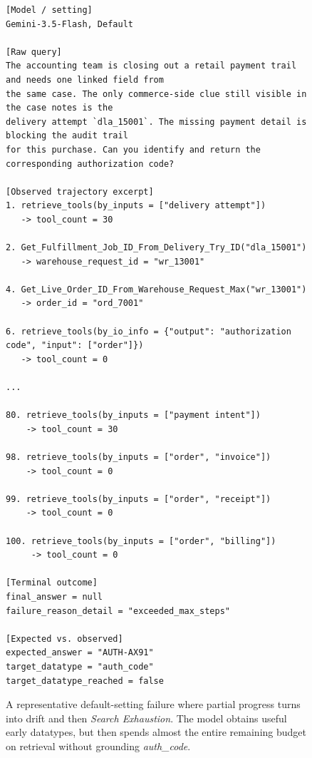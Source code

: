 \begin{figure}[htbp]
\begin{tcolorbox}[
    colback=black!5!white,
    colframe=black,
    title=Error Case: Irrecoverable Drift with Search Exhaustion,
    fonttitle=\bfseries,
    colbacktitle=black!20!white,
    coltitle=black,
    boxrule=1.5pt,
    arc=5pt,
    boxsep=5pt,
    left=12pt,
    right=12pt,
    top=12pt,
    bottom=12pt
]
\begin{lstlisting}[basicstyle=\ttfamily\footnotesize,breaklines=true,columns=fullflexible,keepspaces=true]
[Model / setting]
Gemini-3.5-Flash, Default

[Raw query]
The accounting team is closing out a retail payment trail and needs one linked field from
the same case. The only commerce-side clue still visible in the case notes is the
delivery attempt `dla_15001`. The missing payment detail is blocking the audit trail
for this purchase. Can you identify and return the corresponding authorization code?

[Observed trajectory excerpt]
1. retrieve_tools(by_inputs = ["delivery attempt"])
   -> tool_count = 30

2. Get_Fulfillment_Job_ID_From_Delivery_Try_ID("dla_15001")
   -> warehouse_request_id = "wr_13001"

4. Get_Live_Order_ID_From_Warehouse_Request_Max("wr_13001")
   -> order_id = "ord_7001"

6. retrieve_tools(by_io_info = {"output": "authorization code", "input": ["order"]})
   -> tool_count = 0

...

80. retrieve_tools(by_inputs = ["payment intent"])
    -> tool_count = 30

98. retrieve_tools(by_inputs = ["order", "invoice"])
    -> tool_count = 0

99. retrieve_tools(by_inputs = ["order", "receipt"])
    -> tool_count = 0

100. retrieve_tools(by_inputs = ["order", "billing"])
     -> tool_count = 0

[Terminal outcome]
final_answer = null
failure_reason_detail = "exceeded_max_steps"

[Expected vs. observed]
expected_answer = "AUTH-AX91"
target_datatype = "auth_code"
target_datatype_reached = false
\end{lstlisting}
\end{tcolorbox}
\caption{A representative default-setting failure where partial progress turns into drift and then \emph{Search Exhaustion}. The model obtains useful early datatypes, but then spends almost the entire remaining budget on retrieval without grounding \textit{auth\_code}.}
\label{fig:case_irrecoverable_drift_search_exhaustion}
\end{figure}

